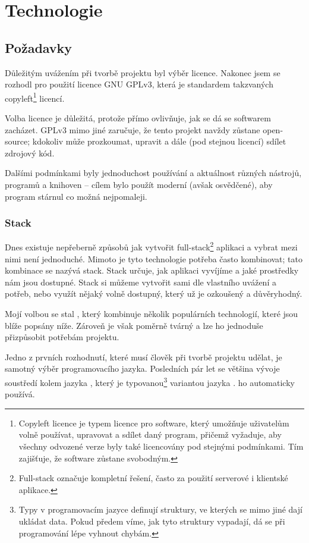\hypertarget{Technologie}{\chapter{Technologie}}

\section{Požadavky}

Důležitým uvážením při tvorbě projektu byl výběr licence. Nakonec jsem se rozhodl pro použití licence GNU GPLv3, která je standardem takzvaných copyleft\footnote{Copyleft licence je typem licence pro software, který umožňuje uživatelům volně používat, upravovat a sdílet daný program, přičemž vyžaduje, aby všechny odvozené verze byly také licencovány pod stejnými podmínkami. Tím zajišťuje, že software zůstane svobodným.} licencí.

Volba licence je důležitá, protože přímo ovlivňuje, jak se dá se softwarem zacházet. GPLv3 mimo jiné zaručuje, že tento projekt navždy zůstane open-source; kdokoliv může prozkoumat, upravit a dále (pod stejnou licencí) sdílet zdrojový kód.\cite{choosealicense}

Dalšími podmínkami byly jednoduchost používání a aktuálnost různých nástrojů, programů a knihoven -- cílem bylo použít moderní (avšak osvědčené), aby program stárnul co možná nejpomaleji.

\subsection{Stack}

Dnes existuje nepřeberně způsobů jak vytvořit full-stack\footnote{Full-stack označuje kompletní řešení, často za použití serverové i klientské aplikace.} aplikaci a vybrat mezi nimi není jednoduché. Mimoto je tyto technologie potřeba často kombinovat; tato kombinace se nazývá stack. Stack určuje, jak aplikaci vyvíjíme a jaké prostředky nám jsou dostupné. Stack si můžeme vytvořit sami dle vlastního uvážení a potřeb, nebo využít nějaký volně dostupný, který už je ozkoušený a důvěryhodný.

Mojí volbou se stal , který kombinuje několik populárních technologií, které jsou blíže popsány níže. Zároveň je však poměrně tvárný a lze ho jednoduše přizpůsobit potřebám projektu.\cite{t3stack}

Jedno z prvních rozhodnutí, které musí člověk při tvorbě projektu udělat, je samotný výběr programovacího jazyka. Posledních pár let se většina vývoje soustředí kolem jazyka , který je typovanou\footnote{Typy v programovacím jazyce definují struktury, ve kterých se mimo jiné dají ukládat data. Pokud předem víme, jak tyto struktury vypadají, dá se při programování lépe vyhnout chybám.} variantou jazyka .  ho automaticky používá. 

